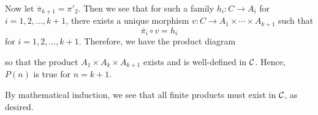 \begin{prf}
\begin{description}
        Now let $\overline{\pi}_{k+1} =
        \pi'_2$. 
        Then we see that for such a family $h_i: C \to A_i$ for $i =
        1,  2, \dots, k+1$, there exists a unique morphism $v: C \to
        A_1 \times \cdots \times A_{k+1}$ such that 
        \[
            \overline{\pi}_i \circ v = h_i
        \]
        for $i = 1, 2, \dots, k + 1$. Therefore, we have the product
        diagram 
        \begin{center}
        \end{center}
        so that the product $A_1 \times A_k \times A_{k+1}$ exists and
        is well-defined in $\mathcal{C}$. Hence, $P(n)$ is true for $n = k+1$.
    \end{description}
    By mathematical induction, we see that all finite products must
    exist in $\mathcal{C}$, as desired. 


\end{prf}
